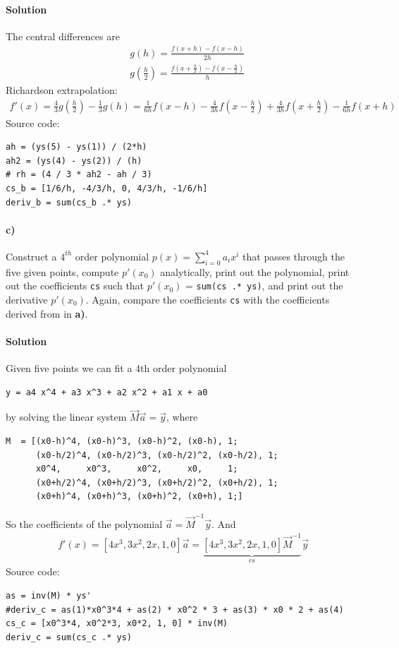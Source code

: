 \documentclass[12pt,a4paper,hidelinks,fleqn]{article}            %
\begin{document}
\paragraph{Solution}
The central differences are
\begin{align*}
& g(h) = \frac{f(x+h) - f(x-h)}{2h} \\
& g\left(\frac{h}{2}\right) = \frac{f(x+\frac h 2) - f(x-\frac h 2)}{h}
\end{align*}
Richardson extrapolation:
\begin{align*}
f'(x) = \frac43 g\left(\frac{h}{2}\right) - \frac13 g(h) = \frac1{6h} f(x-h) - \frac{4}{3h} f(x-\frac{h}2) + \frac{4}{3h} f(x+\frac{h}2) - \frac1{6h} f(x+h)
\end{align*}
Source code:
\begin{verbatim}
ah = (ys(5) - ys(1)) / (2*h)
ah2 = (ys(4) - ys(2)) / (h)
# rh = (4 / 3 * ah2 - ah / 3)
cs_b = [1/6/h, -4/3/h, 0, 4/3/h, -1/6/h]
deriv_b = sum(cs_b .* ys)
\end{verbatim}

\paragraph{c)} Construct a $4^{th}$ order polynomial $p(x) = \sum_{i=0}^4 a_i x^i$ that passes through the five given points, 
compute $p'(x_0)$ analytically, 
print out the polynomial,
print out the coefficients \verb=cs= such that $p'(x_0)$ = \verb=sum(cs .* ys)=,
and print out the derivative $p'(x_0)$.
Again, compare the coefficients \verb=cs= with the coefficients derived from in \textbf{a)}.

\paragraph{Solution}
Given five points we can fit a 4th order polynomial 
\begin{verbatim}
y = a4 x^4 + a3 x^3 + a2 x^2 + a1 x + a0
\end{verbatim}
by solving the linear system $\vec{M} \vec{a} = \vec{y}$, where
\begin{verbatim}
M  = [(x0-h)^4, (x0-h)^3, (x0-h)^2, (x0-h), 1;
      (x0-h/2)^4, (x0-h/2)^3, (x0-h/2)^2, (x0-h/2), 1;
      x0^4, 	x0^3, 	  x0^2,     x0,     1;
      (x0+h/2)^4, (x0+h/2)^3, (x0+h/2)^2, (x0+h/2), 1;
      (x0+h)^4, (x0+h)^3, (x0+h)^2, (x0+h), 1;]
\end{verbatim}
So the coefficients of the polynomial $\vec{a} = \vec{M}^{-1} \vec{y}$.
And 
\begin{align*}
f'(x) = [4x^3, 3x^2, 2x, 1, 0] \vec{a} = \underbrace{[4x^3, 3x^2, 2x, 1, 0] \vec{M}^{-1}}_{cs} \vec{y}
\end{align*}
Source code:
\begin{verbatim}
as = inv(M) * ys' 
#deriv_c = as(1)*x0^3*4 + as(2) * x0^2 * 3 + as(3) * x0 * 2 + as(4)
cs_c = [x0^3*4, x0^2*3, x0*2, 1, 0] * inv(M)
deriv_c = sum(cs_c .* ys)
\end{verbatim}
\end{document}
